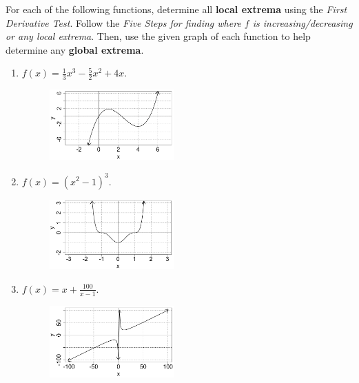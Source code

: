 \begin{example}\label{1stDervTest}
For each of the following functions, determine all \textbf{local extrema} using the \emph{First Derivative Test}. Follow the \emph{Five Steps for finding where $f$ is increasing/decreasing or any local extrema}. Then, use the given graph of each function to help determine any \textbf{global extrema}.
\renewcommand{\labelenumi}{(\alph{enumi})}
\begin{enumerate}[leftmargin=*]
    \item $f(x)=\displaystyle\frac{1}{3}x^3-\frac{5}{2}x^2+4x$. %
    \begin{figure}[h!]
        \includegraphics[width=0.45\textwidth,inner]{images/optimization/exampleGraph2.png}
        \label{fig:exampleGraph2}
    \end{figure}
    \item $f(x)=(x^2-1)^3$. %
    \begin{figure}[h!]
        \includegraphics[width=0.45\textwidth,inner]{images/optimization/exampleGraph3.png}
        \label{fig:exampleGraph3}
    \end{figure}
    \newpage
    \item $f(x)=x+\displaystyle\frac{100}{x-1}$.  %
    \begin{figure}[h!]
        \includegraphics[width=0.45\textwidth,inner]{images/optimization/exampleGraph4.png}

\end{figure}
\end{enumerate}
\end{example}

